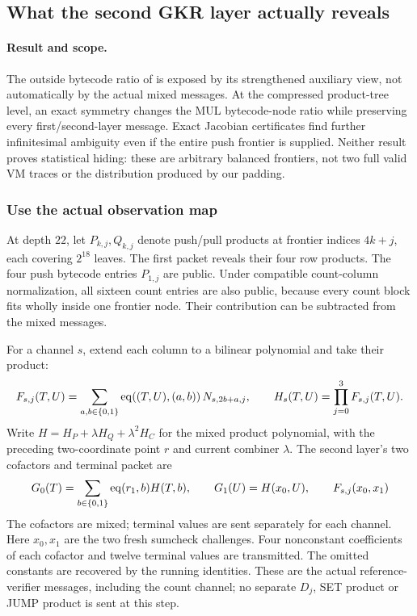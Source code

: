 \subsection{What the second GKR layer actually reveals}\label{note:zk-gkr-second-wire}

\paragraph{Result and scope.} The outside bytecode ratio of  is exposed by its strengthened auxiliary view, not automatically by the actual mixed messages. At the compressed product-tree level, an exact symmetry changes the MUL bytecode-node ratio while preserving every first/second-layer message. Exact Jacobian certificates find further infinitesimal ambiguity even if the entire push frontier is supplied. Neither result proves statistical hiding: these are arbitrary balanced frontiers, not two full valid VM traces or the distribution produced by our padding.

\subsubsection{Use the actual observation map}

At depth $22$, let $P_{k,j},Q_{k,j}$ denote push/pull products at frontier indices $4k+j$, each covering $2^{18}$ leaves. The first packet reveals their four row products. The four push bytecode entries $P_{1,j}$ are public. Under compatible count-column normalization, all sixteen count entries are also public, because every count block fits wholly inside one frontier node. Their contribution can be subtracted from the mixed messages.

For a channel $s$, extend each column to a bilinear polynomial and take their product:
\[
 F_{s,j}(T,U)=\sum_{a,b\in\{0,1\}}\operatorname{eq}((T,U),(a,b))\,N_{s,2b+a,j},
 \qquad H_s(T,U)=\prod_{j=0}^3F_{s,j}(T,U).
\]
Write $H=H_P+\lambda H_Q+\lambda^2H_C$ for the mixed product polynomial, with the preceding two-coordinate point $r$ and current combiner $\lambda$. The second layer's two cofactors and terminal packet are
\[
 G_0(T)=\sum_{b\in\{0,1\}}\operatorname{eq}(r_1,b)H(T,b),\qquad
 G_1(U)=H(x_0,U),\qquad F_{s,j}(x_0,x_1)
\]
The cofactors are mixed; terminal values are sent separately for each channel. Here $x_0,x_1$ are the two fresh sumcheck challenges. Four nonconstant coefficients of each cofactor and twelve terminal values are transmitted. The omitted constants are recovered by the running identities. These are the actual reference-verifier messages, including the count channel; no separate $D_j$, SET product or JUMP product is sent at this step.

